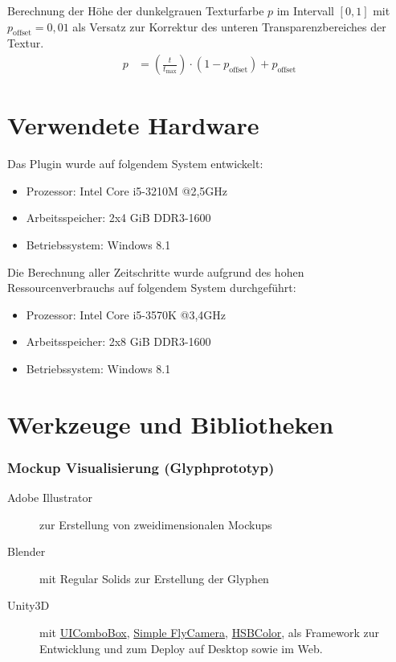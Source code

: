 Berechnung der Höhe der dunkelgrauen Texturfarbe $p$ im Intervall $[0,1]$ mit $p_{\text{offset}} = 0,01$ als Versatz zur Korrektur des unteren Transparenzbereiches der Textur. %
\begin{equation}
\begin{aligned}\label{eq:berechnungen:glyph-textur}
p &= \left(\frac{t}{t_{\text{max}}}\right) \cdot (1 - p_{\text{offset}}) + p_{\text{offset}}
\end{aligned}
\end{equation}

\section{Verwendete Hardware}\label{sec:hardware}
Das Plugin wurde auf folgendem System entwickelt:
\begin{itemize}
	\item Prozessor: Intel Core i5-3210M @2,5GHz
	\item Arbeitsspeicher: 2x4 \gls{GiB} DDR3-1600
	\item Betriebssystem: Windows 8.1
\end{itemize}

Die Berechnung aller Zeitschritte wurde aufgrund des hohen Ressourcenverbrauchs auf folgendem System durchgeführt:
\begin{itemize}
	\item Prozessor: Intel Core i5-3570K @3,4GHz
	\item Arbeitsspeicher: 2x8 \gls{GiB} DDR3-1600
	\item Betriebssystem: Windows 8.1
\end{itemize}

\section{Werkzeuge und Bibliotheken}\label{sec:werkzeuge}

\subsubsection{Mockup Visualisierung (Glyphprototyp)}
\begin{description}
	\item [Adobe Illustrator] zur Erstellung von zweidimensionalen Mockups
	\item [Blender] mit Regular Solids zur Erstellung der Glyphen
	\item [Unity3D] mit \href{http://forum.unity3d.com/threads/a-working-stylable-combo-box-drop-down-list.264167/}{UIComboBox}, \href{http://forum.unity3d.com/threads/fly-cam-simple-cam-script.67042/}{Simple FlyCamera}, \href{http://wiki.unity3d.com/index.php?title=HSBColor}{HSBColor},  als Framework zur Entwicklung und zum Deploy auf Desktop sowie im Web.
\end{description}

